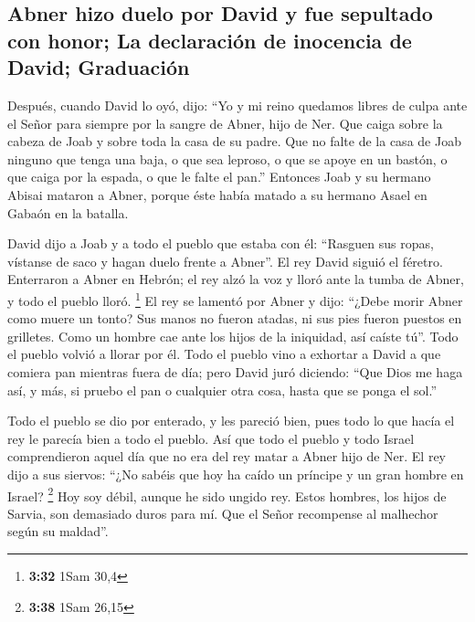 \hypertarget{abner-hizo-duelo-por-david-y-fue-sepultado-con-honor-la-declaraciuxf3n-de-inocencia-de-david-graduaciuxf3n}{%
\subsection{Abner hizo duelo por David y fue sepultado con honor; La
declaración de inocencia de David;
Graduación}\label{abner-hizo-duelo-por-david-y-fue-sepultado-con-honor-la-declaraciuxf3n-de-inocencia-de-david-graduaciuxf3n}}

 Después, cuando David lo oyó, dijo: ``Yo y mi reino
quedamos libres de culpa ante el Señor para siempre por la sangre de
Abner, hijo de Ner.  Que caiga sobre la cabeza de Joab y
sobre toda la casa de su padre. Que no falte de la casa de Joab ninguno
que tenga una baja, o que sea leproso, o que se apoye en un bastón, o
que caiga por la espada, o que le falte el pan.'' 
Entonces Joab y su hermano Abisai mataron a Abner, porque éste había
matado a su hermano Asael en Gabaón en la batalla.

 David dijo a Joab y a todo el pueblo que estaba con él:
``Rasguen sus ropas, vístanse de saco y hagan duelo frente a Abner''. El
rey David siguió el féretro.  Enterraron a Abner en
Hebrón; el rey alzó la voz y lloró ante la tumba de Abner, y todo el
pueblo lloró. \footnote{\textbf{3:32} 1Sam 30,4}  El rey
se lamentó por Abner y dijo: ``¿Debe morir Abner como muere un tonto?
 Sus manos no fueron atadas, ni sus pies fueron puestos
en grilletes. Como un hombre cae ante los hijos de la iniquidad, así
caíste tú''. Todo el pueblo volvió a llorar por él.  Todo
el pueblo vino a exhortar a David a que comiera pan mientras fuera de
día; pero David juró diciendo: ``Que Dios me haga así, y más, si pruebo
el pan o cualquier otra cosa, hasta que se ponga el sol.''

 Todo el pueblo se dio por enterado, y les pareció bien,
pues todo lo que hacía el rey le parecía bien a todo el pueblo.
 Así que todo el pueblo y todo Israel comprendieron aquel
día que no era del rey matar a Abner hijo de Ner.  El rey
dijo a sus siervos: ``¿No sabéis que hoy ha caído un príncipe y un gran
hombre en Israel? \footnote{\textbf{3:38} 1Sam 26,15} 
Hoy soy débil, aunque he sido ungido rey. Estos hombres, los hijos de
Sarvia, son demasiado duros para mí. Que el Señor recompense al
malhechor según su maldad''.

